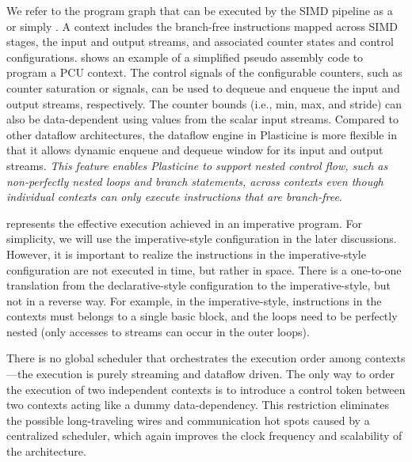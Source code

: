 We refer to the program graph that can be executed by the SIMD pipeline as a  or
simply . 
A context includes the branch-free instructions mapped across SIMD stages, the input and output streams, and associated counter states and control configurations.
 shows an example of a simplified pseudo assembly code to program a PCU context.
The control signals of the configurable counters, such as counter saturation or 
signals, can be used to dequeue and enqueue the input and output streams, respectively.
The counter bounds (i.e., min, max, and stride) can also be data-dependent using values from the scalar input streams. Compared to other dataflow architectures, the dataflow engine in Plasticine is more flexible in that it allows dynamic enqueue and dequeue window for its input and output streams.
\emph{This feature enables Plasticine to support nested control flow, such as non-perfectly nested loops and
branch statements, across contexts even though individual contexts can only execute instructions that are
branch-free}. 

 represents the effective execution achieved in an imperative program.
For simplicity, we will use the imperative-style configuration in the later discussions.
However, it is important to realize the instructions in the imperative-style configuration are not
executed in time, but rather in space.
There is a one-to-one translation from the declarative-style configuration to the imperative-style, but not in a reverse way.
For example, in the imperative-style, 
instructions in the contexts must belongs to a single basic block, and the loops need to be
perfectly nested (only accesses to streams can occur in the outer loops).

There is no global scheduler that orchestrates the execution order among contexts---the execution is purely
streaming and dataflow driven. 
The only way to order the execution of two independent contexts is to introduce a control token between two contexts acting like a dummy data-dependency.
This restriction eliminates the possible long-traveling wires and communication hot spots caused by a
centralized scheduler, which again improves the clock frequency and scalability of the architecture.

